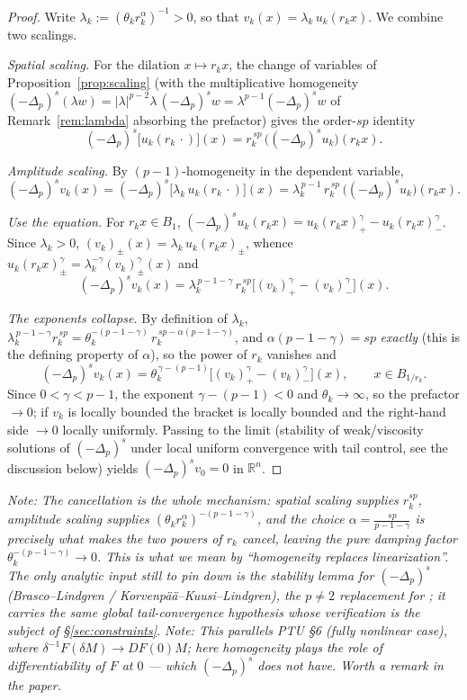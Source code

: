 \documentclass[11pt]{amsart}
\theoremstyle{plain}
\theoremstyle{definition}
\theoremstyle{remark}
\newcommand{\R}{\mathbb{R}}
\newcommand{\fpl}[1]{(-\Delta_p)^{s}#1}            %
\newcommand{\Jp}[1]{|#1|^{p-2}#1}                  %
\newcommand{\al}{\alpha}
\newcommand{\NOTE}[1]{\textcolor{blue!70!black}{\textit{Note: #1}}}
\begin{document}
\begin{proof}
Write $\lambda_k:=(\theta_k r_k^{\al})^{-1}>0$, so that
$v_k(x)=\lambda_k\,u_k(r_kx)$. We combine two scalings.

\emph{Spatial scaling.} For the dilation $x\mapsto r_kx$, the change of
variables of Proposition~\ref{prop:scaling} (with the multiplicative
homogeneity $\fpl{(\lambda w)}=\Jp{\lambda}\,\fpl{w}=\lambda^{p-1}\fpl{w}$
of Remark~\ref{rem:lambda} absorbing the prefactor) gives the order-$sp$
identity
\[
  \fpl{\big[u_k(r_k\,\cdot)\big]}(x)
  = r_k^{\,sp}\,\big(\fpl{u_k}\big)(r_kx).
\]

\emph{Amplitude scaling.} By $(p-1)$-homogeneity in the dependent variable,
\[
  \fpl{v_k}(x)
  = \fpl{\big[\lambda_k\,u_k(r_k\,\cdot)\big]}(x)
  = \lambda_k^{\,p-1}\,r_k^{\,sp}\,\big(\fpl{u_k}\big)(r_kx).
\]

\emph{Use the equation.} For $r_kx\in B_1$, $\fpl{u_k}(r_kx)
=u_k(r_kx)_+^{\gamma}-u_k(r_kx)_-^{\gamma}$. Since $\lambda_k>0$,
$(v_k)_\pm(x)=\lambda_k\,u_k(r_kx)_\pm$, whence
$u_k(r_kx)_\pm^{\gamma}=\lambda_k^{-\gamma}(v_k)_\pm^{\gamma}(x)$ and
\[
  \fpl{v_k}(x)
  = \lambda_k^{\,p-1-\gamma}\,r_k^{\,sp}
    \Big[(v_k)_+^{\gamma}-(v_k)_-^{\gamma}\Big](x).
\]

\emph{The exponents collapse.} By definition of $\lambda_k$,
$\lambda_k^{\,p-1-\gamma}r_k^{\,sp}
=\theta_k^{-(p-1-\gamma)}\,r_k^{\,sp-\al(p-1-\gamma)}$, and
$\al(p-1-\gamma)=sp$ \emph{exactly} (this is the defining property of
$\al$), so the power of $r_k$ vanishes and
\[
  \fpl{v_k}(x)
  = \theta_k^{\,\gamma-(p-1)}\Big[(v_k)_+^{\gamma}-(v_k)_-^{\gamma}\Big](x),
  \qquad x\in B_{1/r_k}.
\]
Since $0<\gamma<p-1$, the exponent $\gamma-(p-1)<0$ and $\theta_k\to\infty$,
so the prefactor $\to0$; if $v_k$ is locally bounded the bracket is locally
bounded and the right-hand side $\to0$ locally uniformly. Passing to the
limit (stability of weak/viscosity solutions of $\fpl{}$ under local
uniform convergence with tail control, see the discussion below) yields
$\fpl{v_0}=0$ in $\R^n$.
\end{proof}
\NOTE{The cancellation is the whole mechanism: spatial scaling supplies
$r_k^{sp}$, amplitude scaling supplies $(\theta_k r_k^{\al})^{-(p-1-\gamma)}$,
and the choice $\al=\frac{sp}{p-1-\gamma}$ is precisely what makes the two
powers of $r_k$ cancel, leaving the pure damping factor
$\theta_k^{-(p-1-\gamma)}\to0$. This is what we mean by ``homogeneity
replaces linearization''. The only analytic input still to pin down is the
stability lemma for $\fpl{}$ (Brasco--Lindgren / Korvenp\"a\"a--Kuusi--Lindgren),
the $p\neq2$ replacement for \cite[Lemma 5]{CS-approx}; it carries the same
\emph{global} tail-convergence hypothesis whose verification is the subject
of \S\ref{sec:constraints}.}
\NOTE{This parallels PTU \S6 (fully nonlinear case), where
$\delta^{-1}F(\delta M)\to DF(0)M$; here homogeneity plays the role of
differentiability of $F$ at $0$ --- which $\fpl{}$ does not have.
Worth a remark in the paper.}
\end{document}
